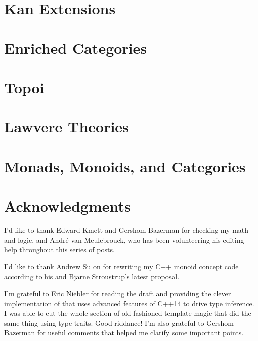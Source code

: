 \chapter{Kan Extensions}\label{kan-extensions}


\chapter{Enriched Categories}\label{enriched-categories}


\chapter{Topoi}\label{topoi}


\chapter{Lawvere Theories}\label{lawvere-theories}


\chapter{Monads, Monoids, and Categories}\label{monads-monoids-categories}


\backmatter

\chapter*{Acknowledgments}

\noindent
I’d like to thank Edward Kmett and Gershom Bazerman for checking my math
and logic, and André van Meulebrouck, who has been volunteering his editing
help throughout this series of posts.

\vspace{1.0em}
\noindent
I’d like to thank Andrew Su on for rewriting my C++ monoid concept
code according to his and Bjarne Stroustrup’s latest proposal.

\vspace{1.0em}
\noindent
I'm grateful to Eric Niebler for reading the draft and providing the
clever implementation of  that uses advanced features of
C++14 to drive type inference. I was able to cut the whole section of
old fashioned template magic that did the same thing using type traits.
Good riddance! I'm also grateful to Gershom Bazerman for useful comments
that helped me clarify some important points.

